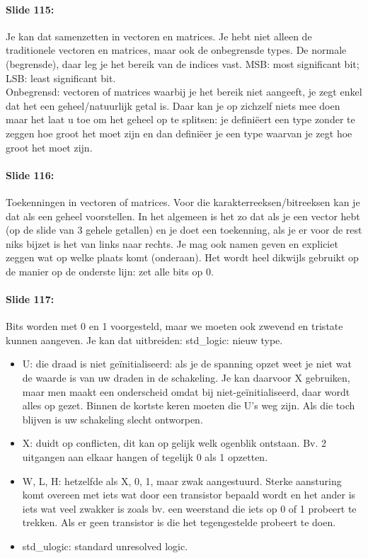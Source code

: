 \documentclass[10pt,a4paper]{book}
\begin{document}
\paragraph{Slide 115:} Je kan dat samenzetten in vectoren en matrices. Je hebt niet alleen de traditionele vectoren en matrices, maar ook de onbegrensde types. De normale (begrensde), daar leg je het bereik van de indices vast. MSB: most significant bit; LSB: least significant bit.\\
Onbegrensd: vectoren of matrices waarbij je het bereik niet aangeeft, je zegt enkel dat het een geheel/natuurlijk getal is. Daar kan je op zichzelf niets mee doen maar het laat u toe om het geheel op te splitsen: je defini\"eert een type zonder te zeggen hoe groot het moet zijn en dan defini\"eer je een type waarvan je zegt hoe groot het moet zijn.

\paragraph{Slide 116:} Toekenningen in vectoren of matrices. Voor die karakterreeksen/bitreeksen kan je dat als een geheel voorstellen. In het algemeen is het zo dat als je een vector hebt (op de slide van 3 gehele getallen) en je doet een toekenning, als je er voor de rest niks bijzet is het van links naar rechts. Je mag ook namen geven en expliciet zeggen wat op welke plaats komt (onderaan). Het wordt heel dikwijls gebruikt op de manier op de onderste lijn: zet alle bits op 0. 

\paragraph{Slide 117:} Bits worden met 0 en 1 voorgesteld, maar we moeten ook zwevend en tristate kunnen aangeven. Je kan dat uitbreiden: std\_logic: nieuw type.
\begin{itemize}
\item U: die draad is niet ge\"initialiseerd: als je de spanning opzet weet je niet wat de waarde is van uw draden in de schakeling. Je kan daarvoor X gebruiken, maar men maakt een onderscheid omdat bij niet-ge\"initialiseerd, daar wordt alles op gezet. Binnen de kortste keren moeten die U's weg zijn. Als die toch blijven is uw schakeling slecht ontworpen.	
\item X: duidt op conflicten, dit kan op gelijk welk ogenblik ontstaan. Bv. 2 uitgangen aan elkaar hangen of tegelijk 0 als 1 opzetten. 	
\item W, L, H: hetzelfde als X, 0, 1, maar zwak aangestuurd. Sterke aansturing komt overeen met iets wat door een transistor bepaald wordt en het ander is iets wat veel zwakker is zoals bv. een weerstand die iets op 0 of 1 probeert te trekken. Als er geen transistor is die het tegengestelde probeert te doen.	
\item std\_ulogic: standard unresolved logic.
\end{itemize}
\end{document}

